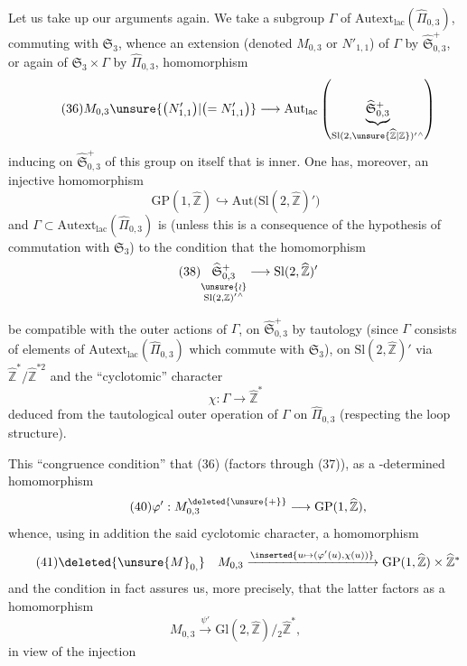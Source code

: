 Let us take up our arguments again. We take a subgroup $\Gamma$ of
$\mathrm{Autext}_{\mathrm{lac}}(\widehat{\Pi}_{0,3})$, commuting with
$\mathfrak S_3$, whence an extension 
(denoted $M_{0,3}$ or $N'_{1,1}$) of $\Gamma$ by
$\widehat{\mathfrak S}_{0,3}^{+}$, or again of
$\mathfrak S_3\times\Gamma$ by $\widehat{\Pi}_{0,3}$,
 homomorphism
\[
\tag{36}
M_{0,3}\unsure{\bigl(N'_{1,1}\bigr)|\bigl(=N'_{1,1}\bigr)}\longrightarrow
\mathrm{Aut}_{\mathrm{lac}}\left(
\underbrace{\widehat{\mathfrak S}_{0,3}^{+}}_{\mathrm{Sl}(2,\unsure{\widehat{\mathbb Z}|\mathbb Z})'{}^{\wedge}}
\right)
\]
inducing on $\widehat{\mathfrak S}_{0,3}^{+}$
of this group on itself that is inner.
One has, moreover, an injective homomorphism
\[
\tag{37}
\mathrm{GP}(1,\widehat{\mathbb Z})\hookrightarrow
\mathrm{Aut}\bigl(\mathrm{Sl}(2,\widehat{\mathbb Z})'\bigr)
\]
and $\Gamma\subset\mathrm{Autext}_{\mathrm{lac}}(\widehat{\Pi}_{0,3})$ is
 (unless this is  a consequence of the hypothesis of commutation with
$\mathfrak S_3$) to the condition that the
 homomorphism
\[
\tag{38}
\underset{\substack{\unsure{\wr}\\\mathrm{Sl}(2,\mathbb Z)'{}^{\wedge}}}{\widehat{\mathfrak S}_{0,3}^{+}}
\longrightarrow\mathrm{Sl}(2,\widehat{\mathbb Z})'
\]



be compatible with the outer actions of $\Gamma$, on
$\widehat{\mathfrak S}_{0,3}^{+}$ by tautology (since $\Gamma$ consists
of elements of $\mathrm{Autext}_{\mathrm{lac}}(\widehat{\Pi}_{0,3})$ which commute with
$\mathfrak S_3$), on $\mathrm{Sl}(2,\widehat{\mathbb Z})'$ via
$\widehat{\mathbb Z}^{*}/\widehat{\mathbb Z}^{*2}$ and the ``cyclotomic'' character
\[
\tag{39}
\chi:\Gamma\longrightarrow\widehat{\mathbb Z}^{*}
\]
deduced from the tautological outer operation of $\Gamma$ on $\widehat{\Pi}_{0,3}$
(respecting the loop structure).

This ``congruence condition'' 
  that (36)
(factors through (37)), as a -determined homomorphism
\[
\tag{40}
\varphi':M_{0,3}^{\deleted{\unsure{+}}}\longrightarrow\mathrm{GP}(1,\widehat{\mathbb Z}),
\]
whence, using in addition the said cyclotomic character, a homomorphism
\[
\tag{41}
\deleted{\unsure{M}_{0,}}\quad M_{0,3}
\xrightarrow{\inserted{u\mapsto(\varphi'(u),\chi(u))}}
\mathrm{GP}(1,\widehat{\mathbb Z})\times\widehat{\mathbb Z}^{*}
\]
and the  condition in fact assures us, more precisely, that the latter
factors as a homomorphism
\[
\tag{42}
M_{0,3}\xrightarrow{\psi'}\mathrm{Gl}(2,\widehat{\mathbb Z})/{}_{2}\widehat{\mathbb Z}^{*},
\]
in view of the injection

